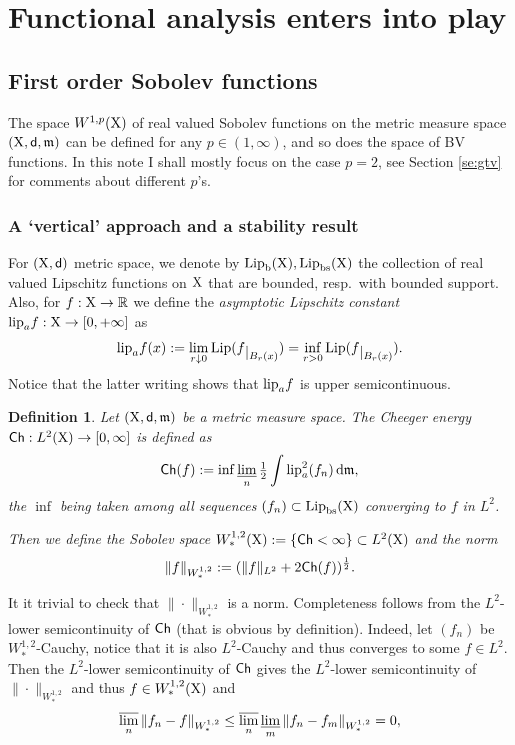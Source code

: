 \documentclass[11pt]{article}
\numberwithin{equation}{section}
\newtheorem{definition}[theorem]{Definition}
\newcommand{\R}{\mathbb{R}}
\newcommand{\restr}[1]{\lower3pt\hbox{$|_{#1}$}}
\newcommand{\X}{{\rm X}}
\newcommand{\sfd}{{\sf d}}
\newcommand{\mm}{{\mathfrak m}}
\newcommand{\ch}{{\sf Ch}}
\renewcommand{\d}{{\rm d}}
\newcommand{\Lip}{{\rm Lip}}
\newcommand{\lipa}{{\rm lip}_a}
\newcommand{\lims}{\varlimsup}
\newcommand{\limi}{\varliminf}
\newcommand{\bs}{{\rm bs}}
\renewcommand{\b}{{\rm b}}
\begin{document}
\section{Functional analysis enters into play}\label{ch:fa}
\subsection{First order Sobolev functions}
The space $W^{1,p}(\X)$ of real valued Sobolev functions on the metric measure space $(\X,\sfd,\mm)$ can be defined for any $p\in(1,\infty)$, and so does the space of BV functions. In this note I shall mostly focus on the case $p=2$, see Section \ref{se:gtv} for comments about different $p$'s. 
\subsubsection{A `vertical' approach and a stability result}\label{se:vertsob}
For $(\X,\sfd)$ metric space, we denote by $\Lip_\b(\X),\Lip_\bs(\X)$ the collection of real valued Lipschitz functions on $\X$ that are bounded, resp.\ with bounded support. Also, for $f:\X\to\R$ we define the \emph{asymptotic Lipschitz constant} $\lipa f:\X\to[0,+\infty]$ as
\[
\lipa f(x):=\lim_{r\downarrow0}\Lip(f\restr{B_r(x)})=\inf_{r>0}\Lip(f\restr{B_r(x)}).
\]
Notice that the latter writing shows that $\lipa f$ is  upper semicontinuous.
\begin{definition}\label{def:ch}
Let $(\X,\sfd,\mm)$ be a metric measure space. The Cheeger energy $\ch:L^2(\X)\to[0,\infty]$ is defined as
\[
\ch(f):=\inf\limi_n\tfrac12\int \lipa^2(f_n)\,\d\mm,
\]
the $\inf$ being taken among all sequences $(f_n)\subset\Lip_\bs(\X)$ converging to $f$ in $L^2$.

Then we define the Sobolev space $W^{1,2}_*(\X):=\{\ch<\infty\}\subset L^2(\X)$ and  the norm
\[
\|f\|_{W^{1,2}_*}:=(\|f\|_{L^2}+2\ch(f))^{\frac12}.
\]
\end{definition}
It it trivial to check that $\|\cdot\|_{W^{1,2}_*}$ is a norm. Completeness follows from the $L^2$-lower semicontinuity of $\ch$ (that is obvious by definition). Indeed, let $(f_n)$ be $W^{1,2}_*$-Cauchy, notice that it is also $L^2$-Cauchy and thus converges to some $f\in L^2$. Then the $L^2$-lower semicontinuity of $\ch$ gives the $L^2$-lower semicontinuity of $\|\cdot\|_{W^{1,2}_*}$ and thus $f\in W^{1,2}_*(\X)$ and
\begin{equation}
\label{eq:chlsc}
\lims_n\|f_n-f\|_{W^{1,2}_*}\leq\lims_n\limi_m\|f_n-f_m\|_{W^{1,2}_*}=0,
\end{equation}
\end{document}
